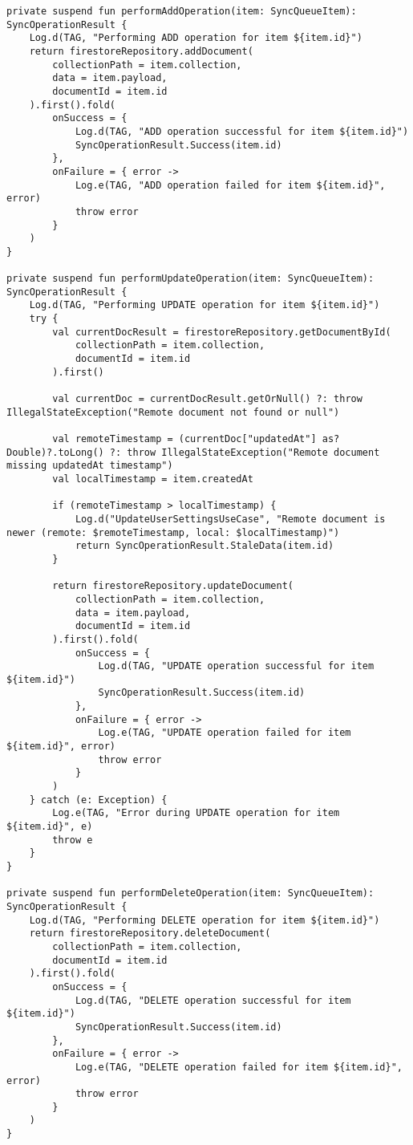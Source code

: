 \begin{lstlisting}[caption=Operazioni di Sincronizzazione, label=lst:sync_operations, basicstyle=\ttfamily\scriptsize, breaklines=true, breakatwhitespace=true, tabsize=4, backgroundcolor=\color{codegray}]
private suspend fun performAddOperation(item: SyncQueueItem): SyncOperationResult {
    Log.d(TAG, "Performing ADD operation for item ${item.id}")
    return firestoreRepository.addDocument(
        collectionPath = item.collection,
        data = item.payload,
        documentId = item.id
    ).first().fold(
        onSuccess = {
            Log.d(TAG, "ADD operation successful for item ${item.id}")
            SyncOperationResult.Success(item.id)
        },
        onFailure = { error ->
            Log.e(TAG, "ADD operation failed for item ${item.id}", error)
            throw error
        }
    )
}

private suspend fun performUpdateOperation(item: SyncQueueItem): SyncOperationResult {
    Log.d(TAG, "Performing UPDATE operation for item ${item.id}")
    try {
        val currentDocResult = firestoreRepository.getDocumentById(
            collectionPath = item.collection,
            documentId = item.id
        ).first()

        val currentDoc = currentDocResult.getOrNull() ?: throw IllegalStateException("Remote document not found or null")

        val remoteTimestamp = (currentDoc["updatedAt"] as? Double)?.toLong() ?: throw IllegalStateException("Remote document missing updatedAt timestamp")
        val localTimestamp = item.createdAt

        if (remoteTimestamp > localTimestamp) {
            Log.d("UpdateUserSettingsUseCase", "Remote document is newer (remote: $remoteTimestamp, local: $localTimestamp)")
            return SyncOperationResult.StaleData(item.id)
        }

        return firestoreRepository.updateDocument(
            collectionPath = item.collection,
            data = item.payload,
            documentId = item.id
        ).first().fold(
            onSuccess = {
                Log.d(TAG, "UPDATE operation successful for item ${item.id}")
                SyncOperationResult.Success(item.id)
            },
            onFailure = { error ->
                Log.e(TAG, "UPDATE operation failed for item ${item.id}", error)
                throw error
            }
        )
    } catch (e: Exception) {
        Log.e(TAG, "Error during UPDATE operation for item ${item.id}", e)
        throw e
    }
}

private suspend fun performDeleteOperation(item: SyncQueueItem): SyncOperationResult {
    Log.d(TAG, "Performing DELETE operation for item ${item.id}")
    return firestoreRepository.deleteDocument(
        collectionPath = item.collection,
        documentId = item.id
    ).first().fold(
        onSuccess = {
            Log.d(TAG, "DELETE operation successful for item ${item.id}")
            SyncOperationResult.Success(item.id)
        },
        onFailure = { error ->
            Log.e(TAG, "DELETE operation failed for item ${item.id}", error)
            throw error
        }
    )
}
\end{lstlisting}

